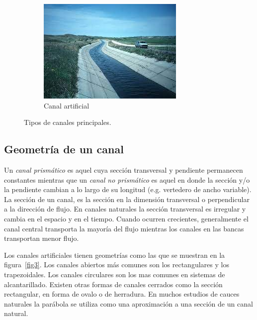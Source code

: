 \documentclass[11pt, oneside]{article}
\begin{document}
\begin{figure}
\begin{subfigure}[b]{0.45\textwidth}
         \includegraphics[width=\textwidth]{fig2b}
         \caption{Canal artificial}
         \label{fig2b}
     \end{subfigure}
      \caption{Tipos de canales principales.}
\end{figure}

\subsection{Geometr\'ia de un canal}
Un \emph{canal prismático} es aquel cuya sección transversal y pendiente permanecen constantes mientras que un \emph{canal no prismático} es aquel en donde la sección y/o la pendiente cambian a lo largo de su longitud (e.g. vertedero de ancho variable). La sección de un canal, es la sección en la dimensión transversal o perpendicular a la direcci\'on de flujo. En  canales naturales la secci\'on transversal es irregular y cambia en el espacio y en el tiempo. Cuando ocurren crecientes, generalmente el canal central transporta la mayoría del flujo mientras los canales en las bancas transportan menor flujo.

Los canales artificiales tienen geometr\'ias como las que se muestran en la figura~\ref{fig3}. Los canales abiertos m\'as comunes son los rectangulares y los trapezoidales. Los canales circulares son los mas comunes en sistemas de alcantarillado. Existen otras formas de canales cerrados como la secci\'on rectangular, en forma de ovalo o de herradura. En muchos estudios de cauces naturales la par\'abola se utiliza como una aproximaci\'on a una secci\'on de un canal natural. 
\end{document}
